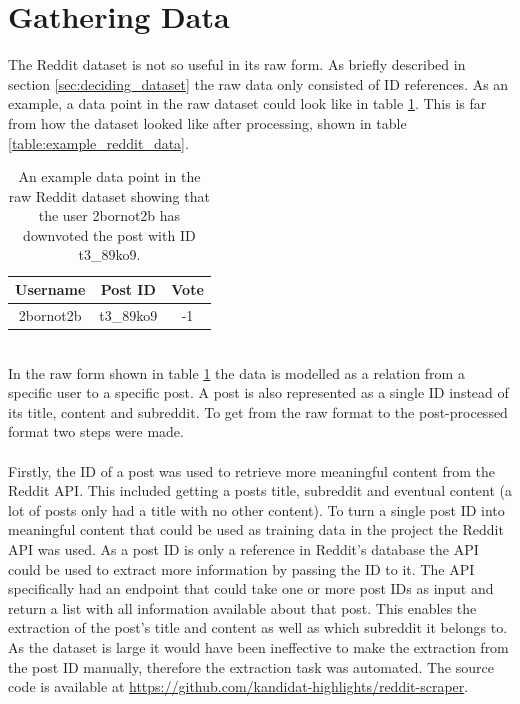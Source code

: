 \section{Gathering Data}\label{sec:gathering_data}
The Reddit dataset is not so useful in its raw form. As briefly described in section \ref{sec:deciding_dataset} the raw data only consisted of ID references. As an example, a data point in the raw dataset could look like in table \ref{table:raw_reddit_data}. This is far from how the dataset looked like after processing, shown in table \ref{table:example_reddit_data}.
\begin{table}[h!]
    \centering
    \begin{tabular}{ c c c } 
        \hline
        \textbf{Username} & \textbf{Post ID} & \textbf{Vote} \\
        \hline
        \hline
        2bornot2b & t3\_89ko9 &-1\\
        \hline
    \end{tabular}
    \caption{An example data point in the raw Reddit dataset showing that the user 2bornot2b has downvoted the post with ID t3\_89ko9.}
    \label{table:raw_reddit_data}
\end{table}
\\
In the raw form shown in table \ref{table:raw_reddit_data} the data is modelled as a relation from a specific user to a specific post. A post is also represented as a single ID instead of its title, content and subreddit. To get from the raw format to the post-processed format two steps were made.   
\\\\
Firstly, the ID of a post was used to retrieve more meaningful content from the Reddit API. This included getting a posts title, subreddit and eventual content (a lot of posts only had a title with no other content). To turn a single post ID into meaningful content that could be used as training data in the project the Reddit API was used. As a post ID is only a reference in Reddit's database the API could be used to extract more information by passing the ID to it. The API specifically had an endpoint that could take one or more post IDs as input and return a list with all information available about that post. This enables the extraction of the post's title and content as well as which subreddit it belongs to. As the dataset is large it would have been ineffective to make the extraction from the post ID manually, therefore the extraction task was automated. The source code is available at \url{https://github.com/kandidat-highlights/reddit-scraper}.
